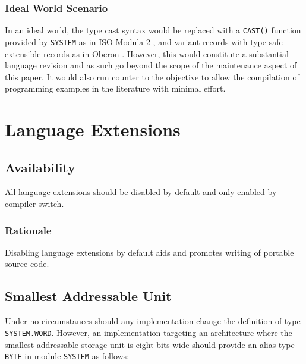 \documentclass[10pt,a4paper]{article} %
\begin{document}
\subsubsection{Ideal World Scenario}

In an ideal world, the type cast syntax would be replaced with a \verb|CAST()| function provided by \verb|SYSTEM| as in ISO Modula-2 \cite{ISO96}, and variant records with type safe extensible records as in Oberon \cite{Wirth90}. However, this would constitute a substantial language revision and as such go beyond the scope of the maintenance aspect of this paper. It would also run counter to the objective to allow the compilation of programming examples in the literature with minimal effort.


\section{Language Extensions}

\subsection{Availability}
All language extensions should be disabled by default and only enabled by compiler switch.

\subsubsection{Rationale}
Disabling language extensions by default aids and promotes writing of portable source code.


\subsection{Smallest Addressable Unit}

Under no circumstances should any implementation change the definition of type \verb|SYSTEM.WORD|. However, an implementation targeting an architecture where the smallest addressable storage unit is eight bits wide should provide an alias type \verb|BYTE| in module \verb|SYSTEM| as follows:
\end{document}
